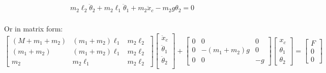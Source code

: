 \documentclass[10pt]{article}
\begin{document}
    \begin{equation}
        \begin{aligned}
            m_2\ell_2\ddot \theta_2 + m_2\ell_1  \ddot \theta_1 +  m_2\ddot x_c -m_2g\theta_2 = 0\\
        \end{aligned}   
    \end{equation}
    




    Or in matrix form:
    \begin{equation}
        \begin{bmatrix}
            (M+m_1+m_2) & (m_1+m_2)\ell_1         & m_2\ell_2\\
            (m_1 +m_2)     & (m_1+m_2)\ell_1   & m_2\ell_2\\
            m_2      & m_2\ell_1            &  m_2\ell_2
        \end{bmatrix}
        \begin{bmatrix}
            \ddot x_c\\
            \ddot \theta_1\\
            \ddot \theta_2\\
        \end{bmatrix}
        +
        \begin{bmatrix}
            0&0&0\\
            0&-(m_1 +m_2)g&0\\
            0&0&-g
        \end{bmatrix}
        \begin{bmatrix}
            x_c\\
            \theta_1\\
            \theta_2
        \end{bmatrix}
        =
        \begin{bmatrix}
            F\\
            0\\
            0
        \end{bmatrix}
    \end{equation}
\end{document}
